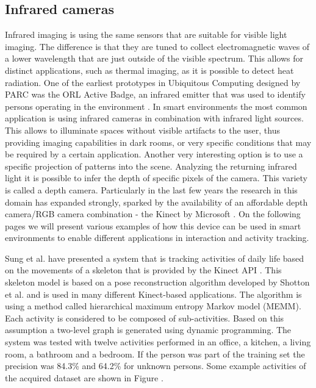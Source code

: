 \subsection{Infrared cameras}
Infrared imaging is using the same sensors that are suitable for visible light imaging. The difference is that they are tuned to collect electromagnetic waves of a lower wavelength that are just outside of the visible spectrum. This allows for distinct applications, such as thermal imaging, as it is possible to detect heat radiation. One of the earliest prototypes in Ubiquitous Computing designed by PARC was the ORL Active Badge, an infrared emitter that was used to identify persons operating in the environment \cite{Weiser1991}. In smart environments the most common application is using infrared cameras in combination with infrared light sources. This allows to illuminate spaces without visible artifacts to the user, thus providing imaging capabilities in dark rooms, or very specific conditions that may be required by a certain application. Another very interesting option is to use a specific projection of patterns into the scene. Analyzing the returning infrared light it is possible to infer the depth of specific pixels of the camera. This variety is called a depth camera. Particularly in the last few years the research in this domain has expanded strongly, sparked by the availability of an affordable depth camera/RGB camera combination - the Kinect by Microsoft \cite{zhang2012microsoft}. On the following pages we will present various examples of how this device can be used in smart environments to enable different applications in interaction and activity tracking.

Sung et al. have presented a system that is tracking activities of daily life based on the movements of a skeleton that is provided by the Kinect API \cite{sung2011human}. This skeleton model is based on a pose reconstruction algorithm developed by Shotton et al. \cite{Shotton2013} and is used in many different Kinect-based applications. The algorithm is using a method called hierarchical maximum entropy Markov model (MEMM). Each activity is considered to be composed of sub-activities. Based on this assumption a two-level graph is generated using dynamic programming. The system was tested with twelve activities performed in an office, a kitchen, a living room, a bathroom and a bedroom. If the person was part of the training set the precision was 84.3\% and 64.2\% for unknown persons. Some example activities of the acquired dataset are shown in Figure .

